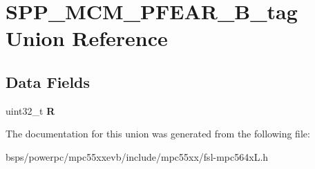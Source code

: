 \hypertarget{unionSPP__MCM__PFEAR__32B__tag}{}\section{S\+P\+P\+\_\+\+M\+C\+M\+\_\+\+P\+F\+E\+A\+R\+\_\+B\+\_\+tag Union Reference}
\label{unionSPP__MCM__PFEAR__32B__tag}
\subsection*{Data Fields}
\begin{DoxyCompactItemize}
\item 
\mbox{\label{unionSPP__MCM__PFEAR__32B__tag_ac54aca2a3f68d1980ae5152dd8d205d1}} 
uint32\+\_\+t {\bfseries R}
\end{DoxyCompactItemize}


The documentation for this union was generated from the following file\+:\begin{DoxyCompactItemize}
\item 
bsps/powerpc/mpc55xxevb/include/mpc55xx/fsl-\/mpc564x\+L.\+h\end{DoxyCompactItemize}
